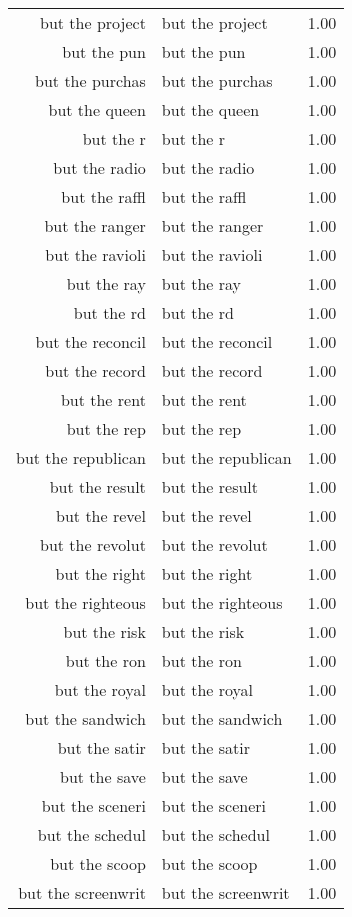 \begin{table}[ht]
\begin{tabular}{rlr}
  but the project & but the project & 1.00 \\ 
  but the pun & but the pun & 1.00 \\ 
  but the purchas & but the purchas & 1.00 \\ 
  but the queen & but the queen & 1.00 \\ 
  but the r & but the r & 1.00 \\ 
  but the radio & but the radio & 1.00 \\ 
  but the raffl & but the raffl & 1.00 \\ 
  but the ranger & but the ranger & 1.00 \\ 
  but the ravioli & but the ravioli & 1.00 \\ 
  but the ray & but the ray & 1.00 \\ 
  but the rd & but the rd & 1.00 \\ 
  but the reconcil & but the reconcil & 1.00 \\ 
  but the record & but the record & 1.00 \\ 
  but the rent & but the rent & 1.00 \\ 
  but the rep & but the rep & 1.00 \\ 
  but the republican & but the republican & 1.00 \\ 
  but the result & but the result & 1.00 \\ 
  but the revel & but the revel & 1.00 \\ 
  but the revolut & but the revolut & 1.00 \\ 
  but the right & but the right & 1.00 \\ 
  but the righteous & but the righteous & 1.00 \\ 
  but the risk & but the risk & 1.00 \\ 
  but the ron & but the ron & 1.00 \\ 
  but the royal & but the royal & 1.00 \\ 
  but the sandwich & but the sandwich & 1.00 \\ 
  but the satir & but the satir & 1.00 \\ 
  but the save & but the save & 1.00 \\ 
  but the sceneri & but the sceneri & 1.00 \\ 
  but the schedul & but the schedul & 1.00 \\ 
  but the scoop & but the scoop & 1.00 \\ 
  but the screenwrit & but the screenwrit & 1.00 \\ 

\end{tabular}
\end{table}
